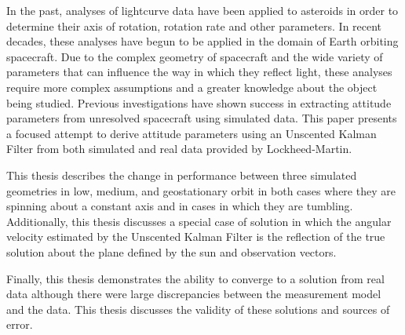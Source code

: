 In the past, analyses of lightcurve data have been applied to asteroids in order to determine their axis of rotation, rotation rate and other parameters. In recent decades, these analyses have begun to be applied in the domain of Earth orbiting spacecraft. Due to the complex geometry of spacecraft and the wide variety of parameters that can influence the way in which they reflect light, these analyses require more complex assumptions and a greater knowledge about the object being studied. Previous investigations have shown success in extracting attitude parameters from unresolved spacecraft using simulated data. This paper presents a focused attempt to derive attitude parameters using an Unscented Kalman Filter from both simulated and real data provided by Lockheed-Martin.

This thesis describes the change in performance between three simulated geometries in low, medium, and geostationary orbit in both cases where they are spinning about a constant axis and in cases in which they are tumbling. Additionally, this thesis discusses a special case of solution in which the angular velocity estimated by the Unscented Kalman Filter is the reflection of the true solution about the plane defined by the sun and observation vectors.

Finally, this thesis demonstrates the ability to converge to a solution from real data although there were large discrepancies between the measurement model and the data. This thesis discusses the validity of these solutions and sources of error.